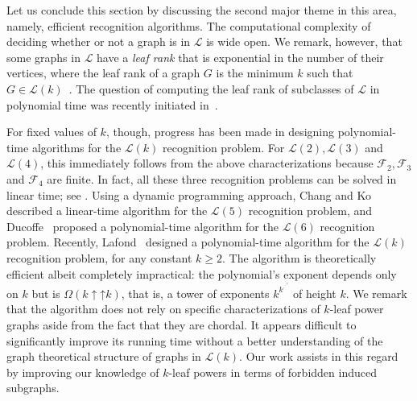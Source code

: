 \documentclass[11pt,letter]{article}
\theoremstyle{remark}
\newcommand{\binuparrow}{\mathbin{\uparrow}}
\newcommand{\F}{\mathscr{F}}
\renewcommand{\L}{\mathcal{L}}
\def\rddots#1{\cdot^{\cdot^{\cdot^{#1}}}}
\begin{document}
Let us conclude this section by discussing the second major theme
in this area, namely, efficient recognition algorithms.
The computational complexity of deciding whether or not a graph is in $\L$ is wide open.  
We remark, however, that some graphs in $\L$ have a {\em leaf rank} that is exponential in the number of their vertices, where the leaf rank of a graph $G$ is the minimum $k$ such that $G \in \L(k)$~\cite{LowerBoundsLR}.  The question of computing the leaf rank of subclasses of $\L$ in polynomial time was recently initiated in~\cite{le2023computing}.

For fixed values of $k$, though, progress has been made in designing polynomial-time algorithms for the $\L(k)$ recognition problem.  For $\L(2), \L(3)$ and $\L(4)$, this immediately follows from the above characterizations because $\F_2, \F_3$ and $\F_4$ are finite. 
In fact, all these three recognition problems can be solved in linear time; see \cite{BRANDSTADT2006,Brandstadt2008-4LP}.
Using a dynamic programming approach, Chang and Ko~\cite{Chang2007} described a linear-time algorithm for the $\L(5)$ recognition problem, and Ducoffe~\cite{ducoffe20194} proposed a polynomial-time algorithm for the $\L(6)$ recognition problem. Recently, Lafond~\cite{Lafond2023} designed a polynomial-time algorithm for the $\L(k)$ recognition problem, for any constant $k \geq 2$. 
The algorithm is theoretically efficient albeit completely impractical: the polynomial's exponent depends only on $k$ but is $\Omega(k \binuparrow\binuparrow k)$, that is, a tower of exponents $k^{k^{\rddots k}}$ of height $k$.  
We remark that the algorithm 
does not rely on specific characterizations of $k$-leaf power graphs aside from the fact that they are chordal. It appears difficult to significantly improve its running time without a better understanding of the graph theoretical structure of graphs in $\L(k)$.  Our work assists in this regard by improving our knowledge of $k$-leaf powers in terms of forbidden induced subgraphs.

\end{document}

